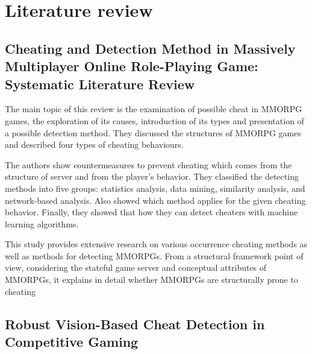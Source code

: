 \chapter{Literature review}
\label{ch:lit_rev}

\section{Cheating and Detection Method in Massively Multiplayer Online Role-Playing Game: Systematic Literature Review \cite{9766355}}

The main topic of this review is the examination of possible cheat in MMORPG games, the exploration of its causes, introduction of its types and presentation of a possible detection method.
They discussed the structures of MMORPG games and described four types of cheating behaviours.

The authors show countermeasures to prevent cheating which comes from the structure of server and from the player's behavior.
They classified the detecting methods into five groups: statistics analysis, data mining, similarity analysis, and network-based analysis.
Also showed which method applies for the given cheating behavior.
Finally, they showed that how they can detect cheaters with machine learning algorithms.

This study provides extensive research on various occurrence cheating methods as well as methods for detecting MMORPGs.
From a structural framework point of view, considering the stateful game server and conceptual attributes of MMORPGs, it explains in detail whether MMORPGs are structurally prone to cheating

\section{Robust Vision-Based Cheat Detection in Competitive Gaming \cite{jonnalagadda2021robust}}

